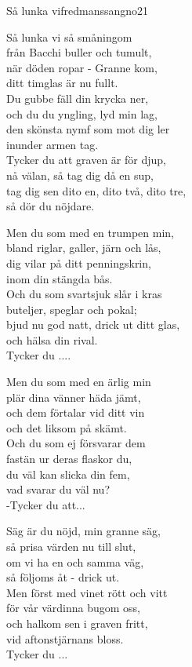 \begin{song}{Så lunka vi}{fredmanssangno21}
\begin{vers}
Så lunka vi så småningom \\
från Bacchi buller och tumult,\\
när döden ropar - Granne kom,\\
ditt timglas är nu fullt.\\
Du gubbe fäll din krycka ner,\\
och du du yngling, lyd min lag,\\
den skönsta nymf som mot dig ler\\
inunder armen tag.\\
Tycker du att graven är för djup,\\
nå välan, så tag dig då en sup,\\
tag dig sen dito en, dito två, dito tre,\\
så dör du nöjdare.\\
\end{vers}
\begin{vers}
Men du som med en trumpen min, \\
bland riglar, galler, järn och lås,\\
dig vilar på ditt penningskrin,\\
inom din stängda bås.\\
Och du som svartsjuk slår i kras\\
buteljer, speglar och pokal;\\
bjud nu god natt, drick ut ditt glas,\\
och hälsa din rival.\\
Tycker du ....\\
\end{vers}
\newp
\begin{vers}
Men du som med en ärlig min\\
plär dina vänner häda jämt,\\
och dem förtalar vid ditt vin\\
och det liksom på skämt.\\
Och du som ej försvarar dem\\
fastän ur deras flaskor du,\\
du väl kan slicka din fem,\\
vad svarar du väl nu?\\
-Tycker du att...\\
\end{vers}
\begin{vers}
Säg är du nöjd, min granne säg, \\
så prisa värden nu till slut,\\
om vi ha en och samma väg,\\
så följoms åt - drick ut.\\
Men först med vinet rött och vitt\\
för vår värdinna bugom oss,\\
och halkom sen i graven fritt,\\
vid aftonstjärnans bloss.\\
Tycker du ...\\
\end{vers}
\end{song}
